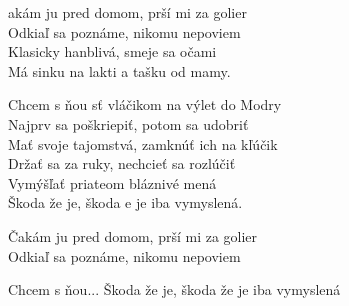 
\ve
{}akám ju pred domom, prší mi za golier\\
Odkiaľ sa poznáme, nikomu nepoviem\\
Klasicky hanblivá, smeje sa očami\\
Má sinku na lakti a tašku od mamy.

\cho{}
Chcem s ňou sť vláčikom na výlet do Modry\\
Najprv sa poškriepiť, potom sa udobriť\\
Mať svoje tajomstvá, zamknúť ich na kľúčik\\
Držať sa za ruky, nechcieť sa rozlúčiť\\
Vymýšľať priateom bláznivé mená\\
Škoda že je, škoda e je iba vymyslená.

\ve
Čakám ju pred domom, prší mi za golier\\
Odkiaľ sa poznáme, nikomu nepoviem

\cho{}
Chcem s ňou...
Škoda že je, škoda že je iba vymyslená

\esong